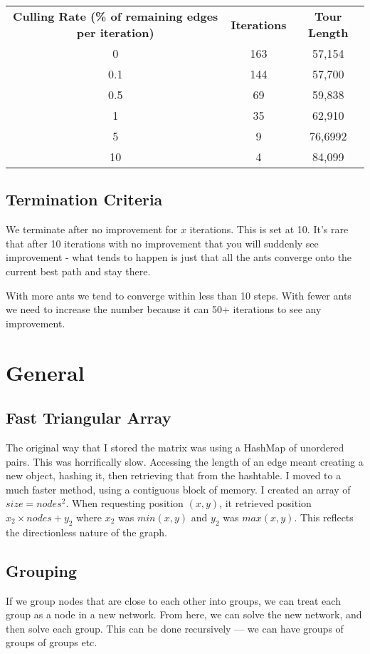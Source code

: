 \documentclass[a4paper, 11pt,table]{article}
\begin{document}
\begin{center}
	\begin{tabu}{|c c c|}
		\textbf{Culling Rate (\% of remaining edges per iteration)} & \textbf{Iterations} & \textbf{Tour Length}\\
		0 & 163 & 57,154\\
		0.1 & 144 & 57,700\\
		0.5 & 69 & 59,838 \\
		1 & 35 & 62,910\\
		5 & 9 & 76,6992\\
		10 & 4 & 84,099\\
	\end{tabu}
\end{center}

\subsection{Termination Criteria}
We terminate after no improvement for $x$ iterations. This is set at 10. It's rare that after 10 iterations with no improvement that you will suddenly see improvement - what tends to happen is just that all the ants converge onto the current best path and stay there.

With more ants we tend to converge within less than 10 steps. With fewer ants we need to increase the number because it can 50+ iterations to see any improvement.

\section{General}
\subsection{Fast Triangular Array}
The original way that I stored the matrix was using a HashMap of unordered pairs. This was horrifically slow. Accessing the length of an edge meant creating a new object, hashing it, then retrieving that from the hashtable. I moved to a much faster method, using a contiguous block of memory. I created an array of $size=nodes^2$. When requesting position $(x,y)$, it retrieved position $x_2 \times nodes + y_2$ where $x_2$ was $min(x,y)$ and $y_2$ was $max(x,y)$. This reflects the directionless nature of the graph.

\subsection{Grouping}
If we group nodes that are close to each other into groups, we can treat each group as a node in a new network. From here, we can solve the new network, and then solve each group. This can be done recursively --- we can have groups of groups of groups etc.
	
\end{document}

